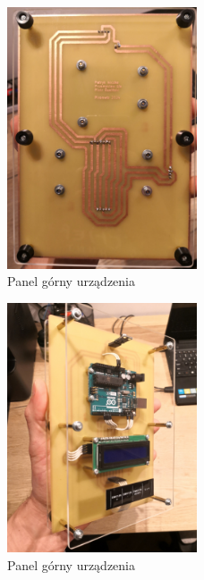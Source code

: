 \begin{figure}[h!]
    \centering
    \includegraphics[width=0.5\textwidth]{images/dpanel.png}
    \caption{Panel górny urządzenia}
    \label{fig:panel_gorny}
\end{figure}

\begin{figure}[h!]
    \centering
    \includegraphics[width=0.5\textwidth]{images/profil.png}
    \caption{Panel górny urządzenia}
    \label{fig:panel_gorny}
\end{figure}

